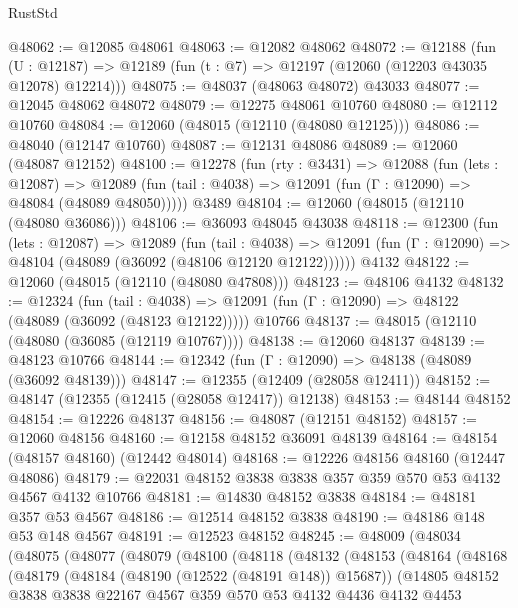 \begin{lexlean}{RustStd}
\begin{coremodule}
@48062 := @12085 @48061
@48063 := @12082 @48062
@48072 := @12188
    (fun (U : @12187) => @12189 (fun (t : @7) => @12197 (@12060 (@12203 @43035 @12078) @12214)))
@48075 := @48037 (@48063 @48072) @43033
@48077 := @12045 @48062 @48072
@48079 := @12275 @48061 @10760
@48080 := @12112 @10760
@48084 := @12060 (@48015 (@12110 (@48080 @12125)))
@48086 := @48040 (@12147 @10760)
@48087 := @12131 @48086
@48089 := @12060 (@48087 @12152)
@48100 := @12278
    (fun (rty : @3431) =>
    @12088
      (fun (lets : @12087) =>
      @12089 (fun (tail : @4038) => @12091 (fun (Γ : @12090) => @48084 (@48089 @48050)))))
    @3489
@48104 := @12060 (@48015 (@12110 (@48080 @36086)))
@48106 := @36093 @48045 @43038
@48118 := @12300
    (fun (lets : @12087) =>
    @12089
      (fun (tail : @4038) =>
      @12091 (fun (Γ : @12090) => @48104 (@48089 (@36092 (@48106 @12120 @12122))))))
    @4132
@48122 := @12060 (@48015 (@12110 (@48080 @47808)))
@48123 := @48106 @4132
@48132 := @12324
    (fun (tail : @4038) => @12091 (fun (Γ : @12090) => @48122 (@48089 (@36092 (@48123 @12122)))))
    @10766
@48137 := @48015 (@12110 (@48080 (@36085 (@12119 @10767))))
@48138 := @12060 @48137
@48139 := @48123 @10766
@48144 := @12342 (fun (Γ : @12090) => @48138 (@48089 (@36092 @48139)))
@48147 := @12355 (@12409 (@28058 @12411))
@48152 := @48147 (@12355 (@12415 (@28058 @12417)) @12138)
@48153 := @48144 @48152
@48154 := @12226 @48137
@48156 := @48087 (@12151 @48152)
@48157 := @12060 @48156
@48160 := @12158 @48152 @36091 @48139
@48164 := @48154 (@48157 @48160) (@12442 @48014)
@48168 := @12226 @48156 @48160 (@12447 @48086)
@48179 := @22031 @48152 @3838 @3838 @357 @359 @570 @53 @4132 @4567 @4132 @10766
@48181 := @14830 @48152 @3838
@48184 := @48181 @357 @53 @4567
@48186 := @12514 @48152 @3838
@48190 := @48186 @148 @53 @148 @4567
@48191 := @12523 @48152
@48245 := @48009
    (@48034
      (@48075
        (@48077
          (@48079
            (@48100
              (@48118
                (@48132
                  (@48153
                    (@48164
                      (@48168
                        (@48179
                          (@48184 (@48190 (@12522 (@48191 @148)) @15687))
                          (@14805
                            @48152
                            @3838
                            @3838
                            @22167
                            @4567
                            @359
                            @570
                            @53
                            @4132
                            @4436
                            @4132
                            @4453

\end{coremodule}
\end{lexlean}
